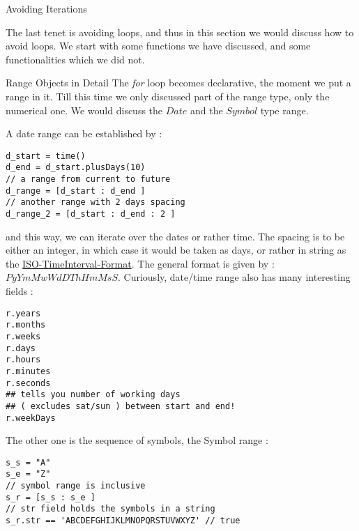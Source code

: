 \begin{section}{Avoiding Iterations}

The last tenet is avoiding loops, and thus in this section we would discuss how to avoid loops.
We start with some functions we have discussed, and some functionalities which we did not. 

\begin{subsection}{Range Objects in Detail}
  
The \emph{for} loop becomes declarative, the moment we put a range in it.
Till this time we only discussed part of the range type, only the numerical one.
We would discuss the $Date$ and the $Symbol$ type range.

A date range can be established by :

\begin{center}\begin{minipage}{\linewidth}
\begin{lstlisting}[style=JexlStyle]
d_start = time()
d_end = d_start.plusDays(10)
// a range from current to future 
d_range = [d_start : d_end ]
// another range with 2 days spacing 
d_range_2 = [d_start : d_end : 2 ]
\end{lstlisting}
\end{minipage}\end{center}

and this way, we can iterate over the dates or rather time.
The spacing is to be either an integer, in which case it would be 
taken as days, or rather in string as the \href{https://en.wikipedia.org/wiki/ISO_8601#Time_intervals}{ISO-TimeInterval-Format}.
The general format is given by :  $PyYmMwWdDThHmMsS$.
Curiously, date/time range also has many interesting fields :

\begin{lstlisting}[style=JexlStyle]
r.years 
r.months 
r.weeks 
r.days 
r.hours 
r.minutes 
r.seconds 
## tells you number of working days 
## ( excludes sat/sun ) between start and end!
r.weekDays 
\end{lstlisting}

The other one is the sequence of symbols, the Symbol range  :
\begin{lstlisting}[style=JexlStyle]
s_s = "A"
s_e = "Z" 
// symbol range is inclusive
s_r = [s_s : s_e ]
// str field holds the symbols in a string 
s_r.str == 'ABCDEFGHIJKLMNOPQRSTUVWXYZ' // true 
\end{lstlisting}


\end{subsection}
\end{section}
